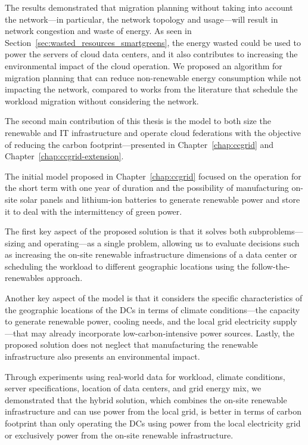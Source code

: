 The results demonstrated that migration planning without taking into account the network---in particular, the network topology and usage---will result in network congestion and waste of energy. As seen in Section~\ref{sec:wasted_resources_smartgreens}, the energy wasted could be used to power the servers of cloud data centers, and it also contributes to increasing the environmental impact of the cloud operation. We proposed an algorithm for migration planning that can reduce non-renewable energy consumption while not impacting the network, compared to works from the literature that schedule the workload migration without considering the network.

The second main contribution of this thesis is the model to both size the renewable and IT infrastructure and operate cloud federations with the objective of reducing the carbon footprint---presented in Chapter~\ref{chap:ccgrid} and Chapter~\ref{chap:ccgrid-extension}. 

The initial model proposed in Chapter~\ref{chap:ccgrid} focused on the operation for the short term with one year of duration and the possibility of manufacturing on-site solar panels and lithium-ion batteries to generate renewable power and store it to deal with the intermittency of green power. 

The first key aspect of the proposed solution is that it solves both subproblems---sizing and operating---as a single problem, allowing us to evaluate decisions such as increasing the on-site renewable infrastructure dimensions of a data center or scheduling the workload to different geographic locations using the follow-the-renewables approach.

Another key aspect of the model is that it considers the specific characteristics of the geographic locations of the DCs in terms of climate conditions---the capacity to generate renewable power, cooling needs, and the local grid electricity supply---that may already incorporate low-carbon-intensive power sources. Lastly, the proposed solution does not neglect that manufacturing the renewable infrastructure also presents an environmental impact. 

Through experiments using real-world data for workload, climate conditions, server specifications, location of data centers, and grid energy mix,  we demonstrated that the hybrid solution, which combines the on-site renewable infrastructure and can use power from the local grid, is better in terms of carbon footprint than only operating the DCs using power from the local electricity grid or exclusively power from the on-site renewable infrastructure.

